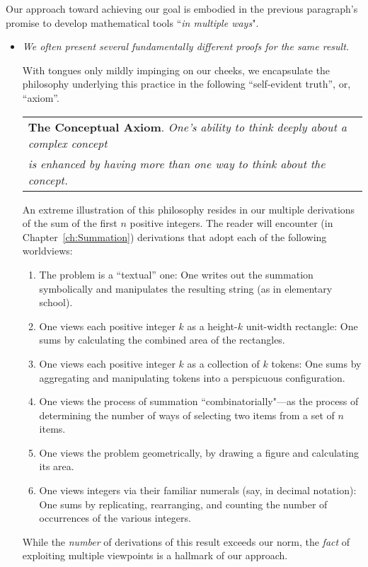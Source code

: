 Our approach toward achieving our goal is embodied in the previous paragraph's promise to develop mathematical tools ``{\em in multiple ways}".
\begin{itemize}
\item
{\em We often present several fundamentally different proofs for the same result.}

\smallskip

With tongues only mildly impinging on our cheeks, we encapsulate the philosophy underlying this practice in the following ``self-evident truth'', or, ``axiom''. 

\medskip

\hspace*{.1in}\begin{tabular}{l}
{\bf The Conceptual Axiom}.
{\em One's ability to think deeply about a complex concept} \\
{\em is enhanced by having more than one way to think about the concept.}
\end{tabular}

\medskip

An extreme illustration of this philosophy resides in our multiple derivations of the sum of the first $n$ positive integers.  The reader will encounter (in Chapter~\ref{ch:Summation}) derivations that adopt each of the following worldviews:
  \begin{enumerate}
    \item
The problem is a ``textual'' one:  One writes out the summation symbolically and manipulates the resulting string (as in elementary school).
  \medskip\item
One views each positive integer $k$ as a height-$k$ unit-width rectangle:  One sums by calculating the combined area of the rectangles.
 \medskip \item
One views each positive integer $k$ as a collection of $k$ tokens:  One sums by aggregating and manipulating tokens into a perspicuous configuration.  
  \medskip\item
One views the process of summation ``combinatorially"---as the process of determining the number of ways of selecting two items from a set of $n$ items.
  \medskip\item
One views the problem geometrically, by drawing a figure and calculating its area.
  \medskip\item
One views integers via their familiar numerals (say, in decimal notation):  One sums by replicating, rearranging, and counting the number of occurrences of the various integers.
  \end{enumerate}
While the {\em number} of derivations of this result exceeds our norm, the {\em fact} of exploiting multiple viewpoints is a hallmark of our approach.


\end{itemize}
